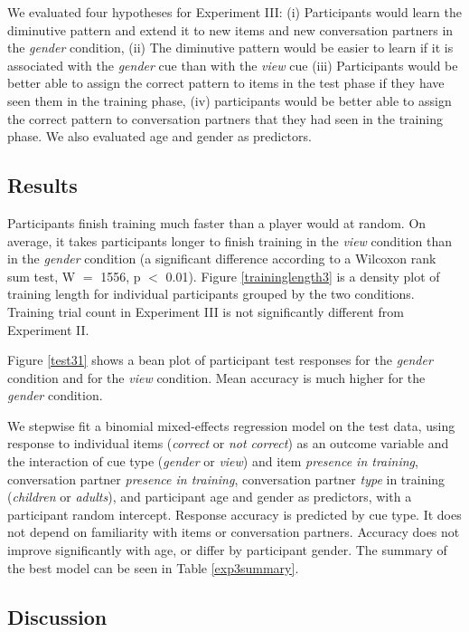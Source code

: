 \documentclass{frontiersSCNS} %
\begin{document}
We evaluated four hypotheses for Experiment III: (i) Participants would learn the diminutive pattern and extend it to new items and new conversation partners in the \emph{gender} condition, (ii) The diminutive pattern would be easier to learn if it is associated with the \emph{gender} cue  than with the \emph{view} cue (iii) Participants would be better able to assign the correct pattern to items in the test phase if they have seen them in the training phase, (iv)  participants would be better able to assign the correct pattern to conversation partners that they had seen in the training phase. We also evaluated age and gender as  predictors.

\subsection{Results \label{exp3res}}

Participants finish training much faster than a player would at random. On average, it takes participants longer to finish training in the \emph{view} condition than in the \emph{gender} condition (a significant difference according to a Wilcoxon rank sum test, W $=$ 1556, p $<$ 0.01). Figure \ref{traininglength3} is a density plot of training length for individual participants grouped by the two conditions. Training trial count in Experiment III is not significantly different from Experiment II. 

Figure \ref{test31} shows a bean plot of participant test responses for the \emph{gender} condition and for the \emph{view} condition. Mean accuracy is much higher for the \emph{gender} condition.

We stepwise fit a binomial mixed-effects regression model on the test data, using response to individual items (\emph{correct} or \emph{not correct}) as an outcome variable and the interaction of cue type (\emph{gender} or \emph{view}) and item \emph{presence in training}, conversation partner \emph{presence in training}, conversation partner \emph{type} in training (\emph{children} or \emph{adults}), and participant age and gender as predictors, with a participant random intercept. Response accuracy is predicted by cue type. It does not depend on familiarity with items or conversation partners. Accuracy does not improve significantly with age, or differ by participant gender. The summary of the best model can be seen in Table \ref{exp3summary}. 

\subsection{Discussion}
\end{document}
